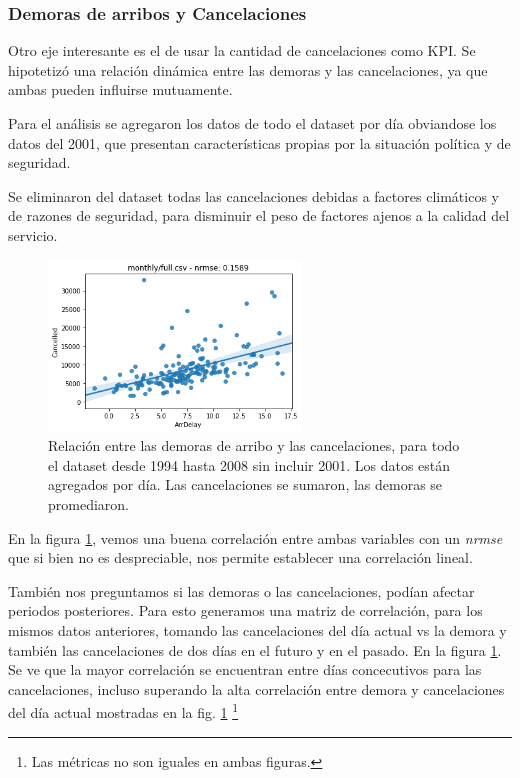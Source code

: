 \subsubsection{Demoras de arribos y Cancelaciones}

Otro eje interesante es el de usar la cantidad de cancelaciones como
KPI. Se hipotetizó una relación dinámica entre las demoras y las
cancelaciones, ya que ambas pueden influirse mutuamente.

Para el análisis se agregaron los datos de todo el dataset por día
obviandose los datos del 2001, que presentan características propias
por la situación política y de seguridad.

Se eliminaron del dataset todas las cancelaciones debidas a factores
climáticos y de razones de seguridad, para disminuir el peso de
factores ajenos a la calidad del servicio.

\begin{figure}[h]
  \includegraphics[width=0.6\textwidth, height=0.24\textheight]{./img/arrDel_vs_cancell.png}
  \centering
  \caption{ Relación entre las demoras de arribo y las cancelaciones,
    para todo el dataset desde 1994 hasta 2008 sin incluir 2001. Los
    datos están agregados por día. Las cancelaciones se sumaron, las
    demoras se promediaron.  }
  \label{fig:cancell-arrdelay}
\end{figure}

En la figura \ref{fig:cancell-arrdelay}, vemos una buena correlación
entre ambas variables con un \emph{nrmse} que si bien no es
despreciable, nos permite establecer una correlación lineal.

También nos preguntamos si las demoras o las cancelaciones, podían
afectar periodos posteriores. Para esto generamos una matriz de
correlación, para los mismos datos anteriores, tomando las
cancelaciones del día actual vs la demora y también las cancelaciones
de dos días en el futuro y en el pasado. En la figura
\ref{fig:cancell-arrdelay}. Se ve que la mayor correlación se
encuentran entre días concecutivos para las cancelaciones, incluso
superando la alta correlación entre demora y cancelaciones del día
actual mostradas en la fig. \ref{fig:cancell-arrdelay} \footnote{Las
  métricas no son iguales en ambas figuras.}

